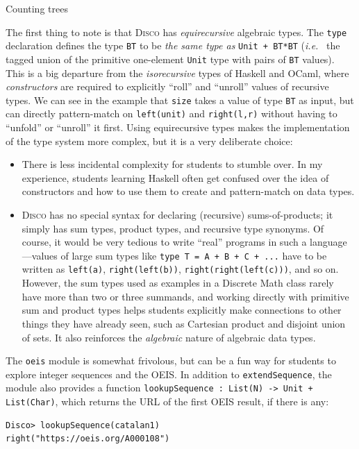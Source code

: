 \documentclass[submission,copyright,creativecommons]{eptcs}
\newcommand{\disco}{\textsc{Disco}\xspace}
\newcommand{\ie}{\emph{i.e.}\ }
\begin{document}
\begin{listing}
  \inputminted{text}{examples/catalan.disco}
  \caption{Counting trees}
  \label{lst:catalan}
\end{listing}

The first thing to note is that \disco has \emph{equirecursive}
algebraic types.  The \texttt{type} declaration defines the type
\texttt{BT} to be \emph{the same type as} \texttt{Unit + BT*BT} (\ie
the tagged union of the primitive one-element \texttt{Unit} type with
pairs of \texttt{BT} values).  This is a big departure from the
\emph{isorecursive} types of Haskell and OCaml, where
\emph{constructors} are required to explicitly ``roll'' and ``unroll''
values of recursive types.  We can see in the example that
\texttt{size} takes a value of type \texttt{BT} as input, but can
directly pattern-match on \texttt{left(unit)} and \texttt{right(l,r)}
without having to ``unfold'' or ``unroll'' it first.  Using
equirecursive types makes the implementation of the type system more
complex, but it is a very deliberate choice:
\begin{itemize}
\item There is less incidental complexity for students to stumble
  over.  In my experience, students learning Haskell often get
  confused over the idea of constructors and how to use them to create
  and pattern-match on data types.
\item \disco has no special syntax for declaring (recursive)
  sums-of-products; it simply has sum types, product types, and
  recursive type synonyms. Of course, it would be very tedious to
  write ``real'' programs in such a language---values of large sum
  types like \texttt{type T = A + B + C + ...} have to be written as
  \texttt{left(a)}, \texttt{right(left(b))},
  \texttt{right(right(left(c)))}, and so on. However, the sum types
  used as examples in a Discrete Math class rarely have more than two
  or three summands, and working directly with primitive sum and
  product types helps students explicitly make connections to other
  things they have already seen, such as Cartesian product and
  disjoint union of sets.  It also reinforces the \emph{algebraic}
  nature of algebraic data types.
\end{itemize}

The \texttt{oeis} module is somewhat frivolous, but can be a fun way
for students to explore integer sequences and the OEIS.  In addition
to \texttt{extendSequence}, the module also provides a function
\texttt{lookupSequence : List(N) -> Unit + List(Char)}, which returns
the URL of the first OEIS result, if there is any:
\begin{verbatim}
Disco> lookupSequence(catalan1)
right("https://oeis.org/A000108")
\end{verbatim}
\end{document}
